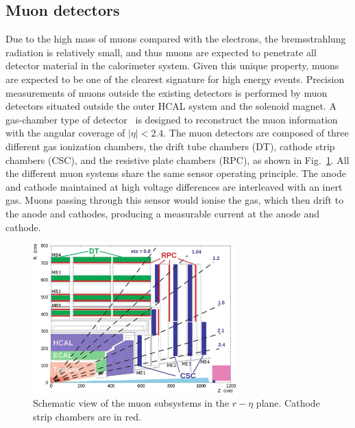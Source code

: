 \subsection{Muon detectors}
Due to the high mass of muons compared with the electrons, the bremsstrahlung radiation is relatively small, and thus muons are expected to penetrate all detector material in the calorimeter system.
Given this unique property, muons are expected to be one of the clearest signature for high energy events.
Precision measurements of muons outside the existing detectors is performed by muon detectors situated outside the outer HCAL system and the solenoid magnet.
A gas-chamber type of detector~\cite{CMS:mu_PF} is designed to reconstruct the muon information with the angular coverage of $|\eta| < 2.4$.
The muon detectors are composed of three different gas ionization chambers, the drift tube chambers (DT), cathode strip chambers (CSC), and the resistive plate chambers (RPC), as shown in Fig.~\ref{fig:cms_muon}.
All the different muon systems share the same sensor operating principle.
The anode and cathode maintained at high voltage differences are interleaved with an inert gas.
Muons passing through this sensor would ionise the gas, which then drift to the anode and cathodes, producing a measurable current at the anode and cathode.
\begin{figure}\centering
    \includegraphics[width=0.7\textwidth]{figure/cms_muon.png}
    \caption[Schematic view of the muon subsystems in the $r-\eta$ plane.]
    {
        Schematic view of the muon subsystems in the $r-\eta$ plane. 
        Cathode strip chambers are in red.
    }
    \label{fig:cms_muon}
\end{figure}


